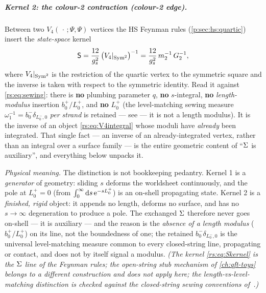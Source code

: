 \subparagraph{Kernel 2: the colour-2 contraction (colour-2 edge).} Between two
$V_4(\,\cdot\,;\Psi,\Psi)$ vertices the HS Feynman rules (\cref{p:sec:hs:quartic}) insert the
\emph{state-space} kernel
\begin{equation}
	\mathsf S
	= \frac{12}{g_s^2}\,\big(V_4|_{\operatorname{Sym}^2}\big)^{-1}
	= \frac{12}{g_s^2}\,m_2^{-1}\,G_2^{-1},
	\label{rs:eq:Skernel}
\end{equation}
where $V_4|_{\operatorname{Sym}^2}$ is the restriction of the quartic vertex to the symmetric
square and the inverse is taken with respect to the symmetric identity. Read it
against \eqref{rs:eq:sewing}: there is \textbf{no} plumbing parameter $q$, \textbf{no}
$s$-integral, \textbf{no} \emph{length-modulus} insertion $b_0^+/L_0^+$, and
\textbf{no} $L_0^+$ (the level-matching sewing measure
$\omega_1^{-1}=b_0^-\delta_{L_0^-,0}$ \emph{per strand} is retained --- see
 --- it is not a length modulus). It is the inverse
of an object \eqref{rs:eq:V4integral} whose moduli have \emph{already} been
integrated. That single fact --- an inverse of an already-integrated vertex,
rather than an integral over a surface family --- is the entire geometric content
of ``$\Sigma$ is auxiliary'', and everything below unpacks it.

\medskip
\noindent\emph{Physical meaning.} The distinction is not bookkeeping pedantry.
Kernel 1 is a \emph{generator} of geometry: sliding $s$ deforms the worldsheet
continuously, and the pole at $L_0^+=0$ (from $\int_0^\infty\mathrm{d} s\,\mathrm{e}^{-sL_0^+}$)
is an on-shell propagating state. Kernel 2 is a \emph{finished, rigid} object: it
appends no length, deforms no surface, and has no $s\to\infty$ degeneration to
produce a pole. The exchanged $\Sigma$ therefore never goes on-shell --- it is
auxiliary --- and the reason is the \emph{absence of a length modulus}
($b_0^+/L_0^+$) on its line, not the boundedness of one; the retained
$b_0^-\delta_{L_0^-,0}$ is the universal level-matching measure common to every
closed-string line, propagating or contact, and does not by itself signal a
modulus. \emph{(The kernel \eqref{rs:eq:Skernel} is the $\Sigma$ line of the Feynman rules; the open-string stub mechanism of \cref{ch:qft-toys} belongs to a different construction and does not apply here; the length-vs-level-matching
distinction is checked against the closed-string sewing conventions of~\cite{Erbin:2021:StringFieldTheory}.)}

